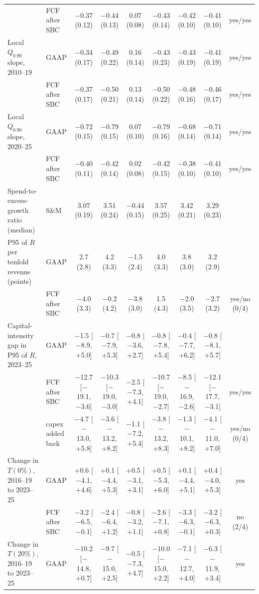 \begin{table}[t]
{\begin{tabular}{llccccccc}
 & FCF after SBC & $-$0.37 (0.12) & $-$0.44 (0.13) & 0.07 (0.08) & $-$0.43 (0.14) & $-$0.42 (0.10) & $-$0.41 (0.10) & yes/yes \\
Local $Q_{0.90}$ slope, 2010--19 & GAAP & $-$0.34 (0.17) & $-$0.49 (0.22) & 0.16 (0.14) & $-$0.43 (0.23) & $-$0.43 (0.19) & $-$0.41 (0.19) & yes/yes \\
 & FCF after SBC & $-$0.37 (0.17) & $-$0.50 (0.21) & 0.13 (0.14) & $-$0.50 (0.22) & $-$0.48 (0.16) & $-$0.46 (0.17) & yes/yes \\
Local $Q_{0.90}$ slope, 2020--25 & GAAP & $-$0.72 (0.15) & $-$0.79 (0.15) & 0.07 (0.10) & $-$0.79 (0.16) & $-$0.68 (0.14) & $-$0.71 (0.14) & yes/yes \\
 & FCF after SBC & $-$0.40 (0.11) & $-$0.42 (0.14) & 0.02 (0.08) & $-$0.42 (0.15) & $-$0.38 (0.10) & $-$0.41 (0.10) & yes/yes \\
Spend-to-excess-growth ratio (median) & S\&M & 3.07 (0.19) & 3.51 (0.24) & $-$0.44 (0.15) & 3.57 (0.25) & 3.42 (0.21) & 3.29 (0.23) &  \\
P95 of $R$ per tenfold revenue (points) & GAAP & 2.7 (2.8) & 4.2 (3.3) & $-$1.5 (2.4) & 4.0 (3.3) & 3.8 (3.0) & 3.2 (2.9) &  \\
 & FCF after SBC & $-$4.0 (3.3) & $-$0.2 (4.2) & $-$3.8 (3.0) & 1.5 (4.3) & $-$2.0 (3.5) & $-$2.7 (3.2) & yes/no (0/4) \\
Capital-intensity gap in P95 of $R$, 2023--25 & GAAP & $-$1.5 [$-$8.9, +5.0] & $-$0.7 [$-$7.9, +5.3] & $-$0.8 [$-$3.6, +2.7] & $-$0.8 [$-$7.8, +5.4] & $-$0.4 [$-$7.7, +6.2] & $-$0.8 [$-$8.1, +5.7] &  \\
 & FCF after SBC & $-$12.7 [$-$19.1, $-$3.6] & $-$10.3 [$-$19.0, $-$3.0] & $-$2.5 [$-$7.3, +4.1] & $-$10.7 [$-$19.0, $-$2.7] & $-$8.5 [$-$16.9, $-$2.6] & $-$12.1 [$-$17.7, $-$3.1] & yes/yes \\
 & capex added back & $-$4.7 [$-$13.0, +5.8] & $-$3.6 [$-$13.2, +8.2] & $-$1.1 [$-$7.2, +5.4] & $-$3.8 [$-$13.2, +8.3] & $-$1.3 [$-$10.1, +8.2] & $-$4.1 [$-$11.0, +7.0] & yes/no (0/4) \\
Change in $T(0\%)$, 2016--19 to 2023--25 & GAAP & +0.6 [$-$4.1, +4.6] & +0.1 [$-$4.4, +5.3] & +0.5 [$-$3.1, +3.1] & +0.5 [$-$5.3, +6.0] & +0.1 [$-$4.4, +5.1] & +0.4 [$-$4.0, +5.3] & yes \\
 & FCF after SBC & $-$3.2 [$-$6.5, $-$0.1] & $-$2.4 [$-$6.4, +1.2] & $-$0.8 [$-$3.2, +1.1] & $-$2.6 [$-$7.1, +0.8] & $-$3.3 [$-$6.3, $-$0.1] & $-$3.2 [$-$6.3, +0.3] & no (2/4) \\
Change in $T(20\%)$, 2016--19 to 2023--25 & GAAP & $-$10.2 [$-$14.8, +0.7] & $-$9.7 [$-$15.0, +2.5] & $-$0.5 [$-$7.3, +4.7] & $-$10.0 [$-$15.0, +2.2] & $-$7.1 [$-$12.7, +4.0] & $-$6.3 [$-$11.9, +3.4] & yes \\

\end{tabular}}
\end{table}
